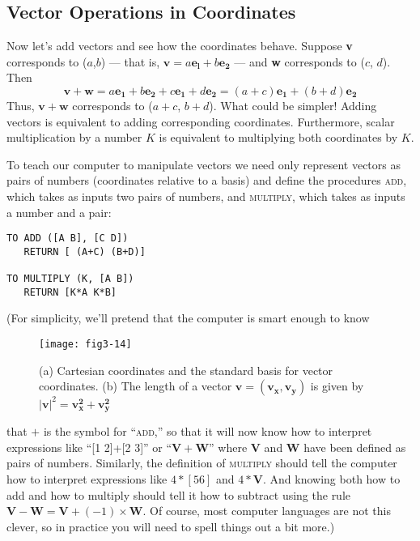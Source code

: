 \documentclass{book}
\begin{document}
\subsection{Vector Operations in Coordinates}

Now let's add vectors and see how the coordinates behave. Suppose \textbf{v}
corresponds to ($a$,$b$) --- that is, $\mathbf{v} = a\mathbf{e_l} + b\mathbf{e_2}$ --- and \textbf{w} corresponds to
($c$, $d$). Then $$\mathbf{v} + \mathbf{w} = a\mathbf{e_1} + b\mathbf{e_2} + c\mathbf{e_1} + d\mathbf{e_2} = (a+c)\mathbf{e_1}+(b+d)\mathbf{e_2}$$ Thus, $\mathbf{v}+\mathbf{w}$ corresponds to ($a+c$, $b+d$). What could be simpler! Adding
vectors is equivalent to adding corresponding coordinates. Furthermore,
scalar multiplication by a number $K$ is equivalent to multiplying both
coordinates by $K$.

To teach our computer to manipulate vectors we need only represent
vectors as pairs of numbers (coordinates relative to a basis) and define
the procedures \textsc{add}, which takes as inputs two pairs of numbers, and
\textsc{multiply}, which takes as inputs a number and a pair:

\begin{verbatim}
TO ADD ([A B], [C D])
   RETURN [ (A+C) (B+D)]

TO MULTIPLY (K, [A B])
   RETURN [K*A K*B]
\end{verbatim}
(For simplicity, we'll pretend that the computer is smart enough to know

\begin{figure}
\begin{center}
\texttt{[image: fig3-14]}
\caption{(a) Cartesian coordinates and the standard basis for vector coordinates. (b) The length of a vector $\mathbf{v} = (\mathbf{v_x}, \mathbf{v_y})$ is given by $|\mathbf{v}|^2 = \mathbf{v_x^2} + \mathbf{v_y^2}$}
\end{center}
\end{figure}

that $+$ is the symbol for ``\textsc{add},'' so that it will now know how to interpret
expressions like ``[1 2]+[2 3]'' or ``$\mathbf{V} + \mathbf{W}$'' where $\mathbf{V}$ and $\mathbf{W}$ have been
defined as pairs of numbers. Similarly, the definition of \textsc{multiply} should
tell the computer how to interpret expressions like $4 * [5 6]$ and $4 * \mathbf{V}$.
And knowing both how to add and how to multiply should tell it how to
subtract using the rule $\mathbf{V} - \mathbf{W} = \mathbf{V} + (-1) \times \mathbf{W}$. Of course, most computer
languages are not this clever, so in practice you will need to spell things
out a bit more.)
\end{document}
